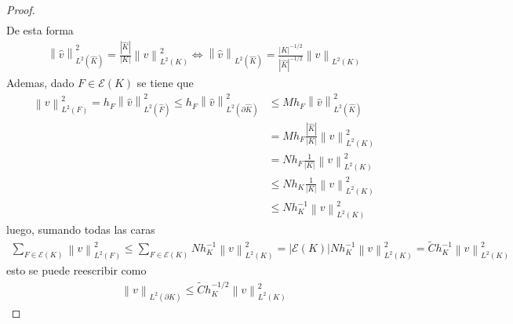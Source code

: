 \documentclass[10pt,a4paper]{report}
\providecommand{\norm}[1]{\left\lVert#1\right\rVert}
\begin{document}
\begin{proof}
\begin{align*}
        \end{align*}
        De esta forma
        \begin{align*}
        	\norm{\hat{v}}^{2}_{L^{2}(\hat{K})} = \frac{|\hat{K}|}{|K|}\norm{v}^{2}_{L^{2}(K)} \iff \norm{\hat{v}}_{L^{2}(\hat{K})} = \frac{|K|^{-1/2}}{|\hat{K}|^{-1/2}}\norm{v}_{L^{2}(K)}
        \end{align*}
        Ademas, dado $F\in \mathscr{E}(K)$ se tiene que
        \begin{align*}
        	\norm{v}^{2}_{L^{2}(F)} = h_{F}\norm{\hat{v}}^{2}_{L^{2}(\hat{F})} \leq h_{F}\norm{\hat{v}}^{2}_{L^{2}(\partial\hat{K})} &\leq Mh_{F}\norm{\hat{v}}^{2}_{L^{2}(\hat{K})}\\ &= Mh_{F}\frac{|\hat{K}|}{|K|}\norm{v}^{2}_{L^{2}(K)}\\  &= N h_{F}\frac{1}{|K|}\norm{v}^{2}_{L^{2}(K)}\\ &\leq N h_{K}\frac{1}{|K|}\norm{v}^{2}_{L^{2}(K)}\\ &\leq Nh^{-1}_{K}\norm{v}^{2}_{L^{2}(K)}
        \end{align*}
        luego, sumando todas las caras
        \begin{align*}
        	\sum_{F\in\mathscr{E}(K)}\norm{v}^{2}_{L^{2}(F)} \leq \sum_{F\in\mathscr{E}(K)}Nh^{-1}_{K}\norm{v}^{2}_{L^{2}(K)} = |\mathscr{E}(K)|Nh^{-1}_{K} \norm{v}^{2}_{L^{2}(K)} = \tilde{C}h^{-1}_{K}\norm{v}^{2}_{L^{2}(K)}
        \end{align*}
        esto se puede reescribir como
        \begin{align*}
        	\norm{v}_{L^{2}(\partial K)} \leq \tilde{C}h^{-1/2}_{K}\norm{v}^{2}_{L^{2}(K)}
        \end{align*}
    \end{proof}
\end{document}
